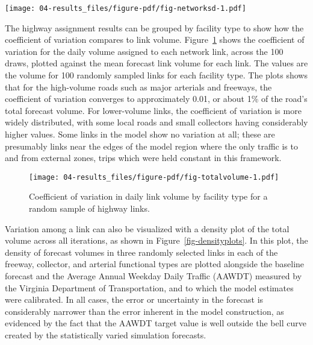 \documentclass[
  letterpaper,
  authoryear,
  review,
  3p]{elsarticle}
\begin{document}
\begin{sidewaysfigure}

{\centering \texttt{[image: 04-results\_files/figure-pdf/fig-networksd-1.pdf]}

}

\caption{\label{fig-networksd}Standard deviation in daily forecast
volume.}

\end{sidewaysfigure}

The highway assignment results can be grouped by facility type to show
how the coefficient of variation compares to link volume.
Figure~\ref{fig-totalvolume} shows the coefficient of variation for the
daily volume assigned to each network link, across the 100 draws,
plotted against the mean forecast link volume for each link. The values
are the volume for 100 randomly sampled links for each facility type.
The plots shows that for the high-volume roads such as major arterials
and freeways, the coefficient of variation converges to approximately
0.01, or about 1\% of the road's total forecast volume. For lower-volume
links, the coefficient of variation is more widely distributed, with
some local roads and small collectors having considerably higher values.
Some links in the model show no variation at all; these are presumably
links near the edges of the model region where the only traffic is to
and from external zones, trips which were held constant in this
framework.

\begin{figure}

{\centering \texttt{[image: 04-results\_files/figure-pdf/fig-totalvolume-1.pdf]}

}

\caption{\label{fig-totalvolume}Coefficient of variation in daily link
volume by facility type for a random sample of highway links.}

\end{figure}

Variation among a link can also be visualized with a density plot of the
total volume across all iterations, as shown in
Figure~\ref{fig-densityplots}. In this plot, the density of forecast
volumes in three randomly selected links in each of the freeway,
collector, and arterial functional types are plotted alongside the
baseline forecast and the Average Annual Weekday Daily Traffic (AAWDT)
measured by the Virginia Department of Transportation, and to which the
model estimates were calibrated. In all cases, the error or uncertainty
in the forecast is considerably narrower than the error inherent in the
model construction, as evidenced by the fact that the AAWDT target value
is well outside the bell curve created by the statistically varied
simulation forecasts.
\end{document}
